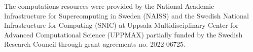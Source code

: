 \documentclass[draft]{agujournal2019}
\begin{document}
\acknowledgments
The computations resources were provided by the National Academic Infrastructure for Supercomputing in Sweden (NAISS) and the Swedish National Infrastructure for Computing (SNIC) at Uppsala Multidisciplinary Center for Advanced Computational Science (UPPMAX) partially funded by the Swedish Research Council through grant agreements no. 2022-06725.


%
 
%

%



%
%
%
%
%
\end{document}
